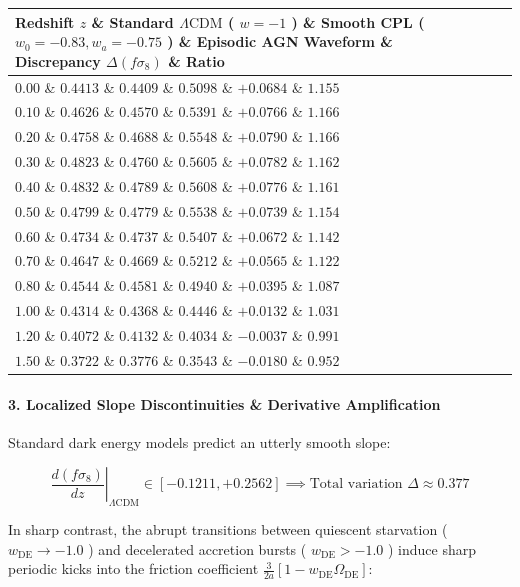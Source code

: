 \documentclass[11pt,a4paper]{article}
\theoremstyle{definition}\newtheorem{definition}{Definition}
\theoremstyle{remark}\newtheorem{remark}{Remark}
\begin{document}
\begin{longtable}{llllll}
\hline
Redshift $z$ \& Standard $\Lambda\text{CDM}$ ( $w = -1$ ) \& Smooth CPL ( $w_0 = -0.83, w_a = -0.75$ ) \& Episodic AGN Waveform \& Discrepancy $\Delta(f\sigma_8)$ \& Ratio \\
\hline
\textbf{$0.00$} \& $0.4413$ \& $0.4409$ \& \textbf{$0.5098$} \& $+0.0684$ \& $1.155$ \\
\textbf{$0.10$} \& $0.4626$ \& $0.4570$ \& \textbf{$0.5391$} \& $+0.0766$ \& $1.166$ \\
\textbf{$0.20$} \& $0.4758$ \& $0.4688$ \& \textbf{$0.5548$} \& $+0.0790$ \& $1.166$ \\
\textbf{$0.30$} \& $0.4823$ \& $0.4760$ \& \textbf{$0.5605$} \& $+0.0782$ \& $1.162$ \\
\textbf{$0.40$} \& $0.4832$ \& $0.4789$ \& \textbf{$0.5608$} \& $+0.0776$ \& $1.161$ \\
\textbf{$0.50$} \& $0.4799$ \& $0.4779$ \& \textbf{$0.5538$} \& $+0.0739$ \& $1.154$ \\
\textbf{$0.60$} \& $0.4734$ \& $0.4737$ \& \textbf{$0.5407$} \& $+0.0672$ \& $1.142$ \\
\textbf{$0.70$} \& $0.4647$ \& $0.4669$ \& \textbf{$0.5212$} \& $+0.0565$ \& $1.122$ \\
\textbf{$0.80$} \& $0.4544$ \& $0.4581$ \& \textbf{$0.4940$} \& $+0.0395$ \& $1.087$ \\
\textbf{$1.00$} \& $0.4314$ \& $0.4368$ \& \textbf{$0.4446$} \& $+0.0132$ \& $1.031$ \\
\textbf{$1.20$} \& $0.4072$ \& $0.4132$ \& \textbf{$0.4034$} \& $-0.0037$ \& $0.991$ \\
\textbf{$1.50$} \& $0.3722$ \& $0.3776$ \& \textbf{$0.3543$} \& $-0.0180$ \& $0.952$ \\
\hline
\end{longtable}\paragraph{3. Localized Slope Discontinuities \& Derivative Amplification}

Standard dark energy models predict an utterly smooth slope:


\begin{equation}
\left.\frac{d(f\sigma_8)}{dz}\right|_{\Lambda\text{CDM}} \in [-0.1211, +0.2562] \implies \text{Total variation } \Delta \approx 0.377
\end{equation}


In sharp contrast, the abrupt transitions between quiescent starvation ( $w_{\text{DE}} \to -1.0$ ) and decelerated accretion bursts ( $w_{\text{DE}} > -1.0$ ) induce sharp periodic kicks into the friction coefficient $\frac{3}{2a}[1 - w_{\text{DE}}\Omega_{\text{DE}}]$:
\end{document}
